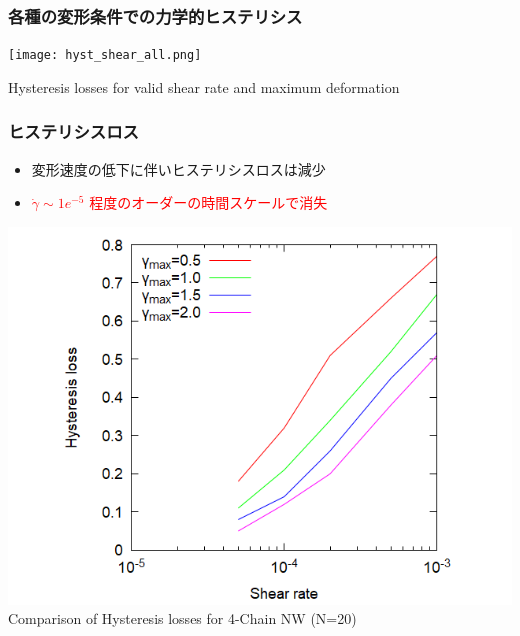 \documentclass[aspectratio=169,11pt, dvipdfmx]{beamer}
\begin{document}
\begin{frame}
	\frametitle{各種の変形条件での力学的ヒステリシス}
		\centering
			\texttt{[image: hyst\_shear\_all.png]}

            \vspace*{-2mm}
			Hysteresis losses for valid shear rate and maximum deformation
\end{frame}

\begin{frame}
	\frametitle{ヒステリシスロス}
	\begin{itemize}
		\item 変形速度の低下に伴いヒステリシスロスは減少
		\item \textcolor{red}{$\dot{\gamma} \sim 1e^{-5}$ 程度のオーダーの時間スケールで消失}
	\end{itemize}
			\centering
				\includegraphics[width=.5\textwidth]{hyst_shear.png}\\
					Comparison of Hysteresis losses for 4-Chain NW (N=20)
\end{frame}
\end{document}
